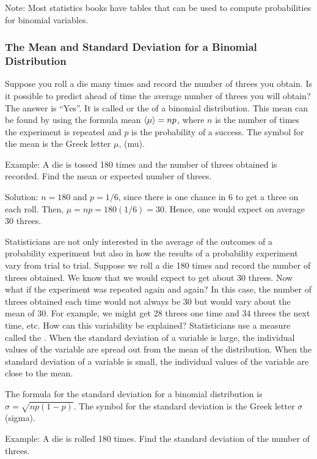 Note: Most statistics books have tables that can be used to compute probabilities for binomial variables.

\subsubsection{The Mean and Standard Deviation for a Binomial Distribution}
Suppose you roll a die many times and record the number of threes you obtain. Is it possible to predict ahead of time the average number of threes you will obtain? The answer is ``Yes''. It is called  or the  of a binomial distribution. This mean can be found by using the formula mean $\left\langle{\mu}\right\rangle = np$, where $n$ is the number of times the experiment is repeated and $p$ is the probability of a success. The symbol for the mean is the Greek letter $\mu$, (mu).

Example: A die is tossed 180 times and the number of threes obtained is recorded. Find the mean or expected number of threes.

Solution: $n = 180$ and $p = 1/6$, since there is one chance in 6 to get a three on each roll. Then, $\mu = np = 180(1/6) = 30$. Hence, one would expect on average 30 threes.

Statisticians are not only interested in the average of the outcomes of a probability experiment but also in how the results of a probability experiment vary from trial to trial. Suppose we roll a die 180 times and record the number of threes obtained. We know that we would expect to get about 30 threes. Now what if the experiment was repeated again and again? In this case, the number of threes obtained each time would not always be 30 but would vary about the mean of 30. For example, we might get 28 threes one time and 34 threes the next time, etc. How can this variability be explained? Statisticians use a measure called the . When the standard deviation of a variable is large, the individual values of the variable are spread out from the mean of the distribution. When the standard deviation of a variable is small, the individual values of the variable are close to the mean.

The formula for the standard deviation for a binomial distribution is $\sigma = \sqrt{np(1-p)}$. The symbol for the standard deviation is the Greek letter $\sigma$ (sigma).

Example: A die is rolled 180 times. Find the standard deviation of the number of threes.

